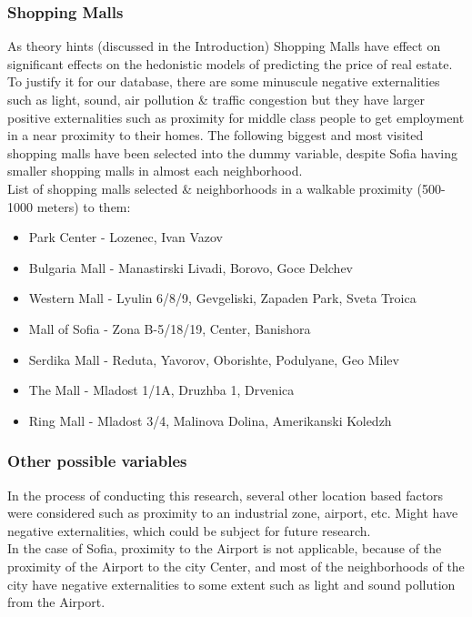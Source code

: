 \documentclass[]{article}
\begin{document}
\subsubsection{Shopping Malls}
As theory hints (discussed in the Introduction) Shopping Malls have effect on significant effects on the hedonistic models of predicting the price of real estate. To justify it for our database, there are some minuscule negative externalities such as light, sound, air pollution \& traffic congestion but they have larger positive externalities such as proximity for middle class people to get employment in a near proximity to their homes. The following biggest and most visited shopping malls have been selected into the dummy variable, despite Sofia having smaller shopping malls in almost each neighborhood.\\


List of shopping malls selected \& neighborhoods in a walkable proximity (500-1000 meters) to them: 
\begin{itemize}
	\item[] Park Center - Lozenec, Ivan Vazov
	\item[] Bulgaria Mall - Manastirski Livadi, Borovo, Goce Delchev
	\item[] Western Mall - Lyulin 6/8/9, Gevgeliski, Zapaden Park, Sveta Troica
	\item[] Mall of Sofia - Zona B-5/18/19, Center, Banishora
	\item[] Serdika Mall - Reduta, Yavorov, Oborishte, Podulyane, Geo Milev
	\item[] The Mall - Mladost 1/1A, Druzhba 1, Drvenica
	\item[] Ring Mall - Mladost 3/4, Malinova Dolina, Amerikanski Koledzh
\end{itemize}

\subsubsection{Other possible variables}
In the process of conducting this research, several other location based factors were considered such as proximity to an industrial zone, airport, etc. Might have negative externalities, which could be subject for future research.\\

In the case of Sofia, proximity to the Airport is not applicable, because of the proximity of the Airport to the city Center, and most of the neighborhoods of the city  have negative externalities to some extent such as light and sound pollution from the Airport.\\
\end{document}
